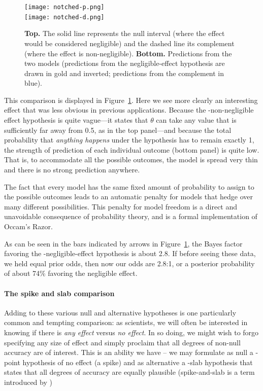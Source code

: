 \begin{figure}[t]
\texttt{[image: notched-p.png]}\\
\texttt{[image: notched-d.png]}
\caption{\textbf{Top.} The solid line represents the null interval (where the effect would be considered negligible) and the dashed line its complement (where the effect is non-negligible). \textbf{Bottom.} Predictions from the two models (predictions from the negligible-effect hypothesis are drawn in gold and inverted; predictions from the complement in blue).}\label{fig:r}
\end{figure}

This comparison is displayed in Figure~\ref{fig:r}. Here we see more clearly an interesting effect that was less obvious in previous applications.  Because the \hyp{non-negligible effect hypothesis} is quite vague---it states that $\theta$ can take any value that is sufficiently far away from 0.5, as in the top panel---and because the total probability that \emph{anything happens} under the hypothesis has to remain exactly 1, the strength of prediction of each individual outcome (bottom panel) is quite low.  That is, to accommodate all the possible outcomes, the model is spread very thin and there is no strong prediction anywhere.

The fact that every model has the same fixed amount of probability to assign to the possible outcomes leads to an automatic penalty for models that hedge over many different possibilities.  This penalty for model freedom is a direct and unavoidable consequence of probability theory, and is a formal implementation of Occam's Razor.

As can be seen in the bars indicated by arrows in Figure~\ref{fig:r}, the Bayes factor favoring the \hyp{negligible-effect hypothesis} is about 2.8.  If before seeing these data, we held equal prior odds, then now our odds are 2.8:1, or a posterior probability of about 74\% favoring the negligible effect.

\paragraph{The spike and slab comparison} 
Adding to these various null and alternative hypotheses is one particularly common and tempting comparison: as scientists, we will often be interested in knowing if there is \emph{any effect} versus \emph{no effect}.  In so doing, we might wish to forgo specifying any size of effect and simply proclaim that all degrees of non-null accuracy are of interest. This is an ability we have -- we may formulate as null a \hyp{point hypothesis} of no effect (a spike) and as alternative a \hyp{slab hypothesis} that states that all degrees of accuracy are equally plausible (spike-and-slab is a term introduced by )

